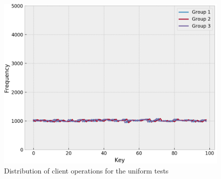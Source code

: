 \begin{figure}[!htb]
  \centering
  \includegraphics[width=\textwidth,height=\textheight,keepaspectratio]{img/clients_loads_constant.png}
  \caption{ Distribution of client operations for the uniform tests }
  \label{fig:uniform-skewed-loads}
\end{figure}




